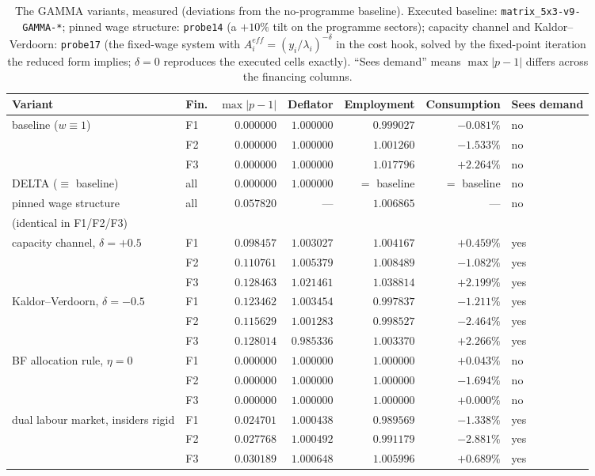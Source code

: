 \documentclass[11pt]{article}
\begin{document}
\begin{table}[htbp]
\centering
\caption{The GAMMA variants, measured (deviations from the no-programme
baseline). Executed baseline: \texttt{matrix\_5x3-v9-GAMMA-*}; pinned wage
structure: \texttt{probe14} (a $+10\%$ tilt on the programme sectors);
capacity channel and Kaldor--Verdoorn: \texttt{probe17} (the fixed-wage system
with $A^{eff}_i = (y_i/\lambda_i)^{-\delta}$ in the cost hook, solved by the
fixed-point iteration the reduced form implies; $\delta = 0$ reproduces the
executed cells exactly). ``Sees demand'' means $\max|p-1|$ differs across the
financing columns.}
\label{tab:gamma}
\begin{tabular}{llrrrrl}
\toprule
Variant & Fin. & $\max|p-1|$ & Deflator & Employment & Consumption & Sees demand \\
\midrule
baseline ($w \equiv 1$) & F1 & $0.000000$ & $1.000000$ & $0.999027$ & $-0.081\%$ & no \\
 & F2 & $0.000000$ & $1.000000$ & $1.001260$ & $-1.533\%$ & no \\
 & F3 & $0.000000$ & $1.000000$ & $1.017796$ & $+2.264\%$ & no \\
DELTA ($\equiv$ baseline) & all & $0.000000$ & $1.000000$ & $=$ baseline & $=$ baseline & no \\
pinned wage structure & all & $0.057820$ & --- & $1.006865$ & --- & no \\
\quad (identical in F1/F2/F3) & & & & & & \\
capacity channel, $\delta = +0.5$ & F1 & $0.098457$ & $1.003027$ & $1.004167$ & $+0.459\%$ & yes \\
 & F2 & $0.110761$ & $1.005379$ & $1.008489$ & $-1.082\%$ & yes \\
 & F3 & $0.128463$ & $1.021461$ & $1.038814$ & $+2.199\%$ & yes \\
Kaldor--Verdoorn, $\delta = -0.5$ & F1 & $0.123462$ & $1.003454$ & $0.997837$ & $-1.211\%$ & yes \\
 & F2 & $0.115629$ & $1.001283$ & $0.998527$ & $-2.464\%$ & yes \\
 & F3 & $0.128014$ & $0.985336$ & $1.003370$ & $+2.266\%$ & yes \\
\midrule
BF allocation rule, $\eta = 0$ & F1 & $0.000000$ & $1.000000$ & $1.000000$ & $+0.043\%$ & no \\
 & F2 & $0.000000$ & $1.000000$ & $1.000000$ & $-1.694\%$ & no \\
 & F3 & $0.000000$ & $1.000000$ & $1.000000$ & $+0.000\%$ & no \\
dual labour market, insiders rigid & F1 & $0.024701$ & $1.000438$ & $0.989569$ & $-1.338\%$ & yes \\
 & F2 & $0.027768$ & $1.000492$ & $0.991179$ & $-2.881\%$ & yes \\
 & F3 & $0.030189$ & $1.000648$ & $1.005996$ & $+0.689\%$ & yes \\
\bottomrule
\end{tabular}
\end{table}
\end{document}
